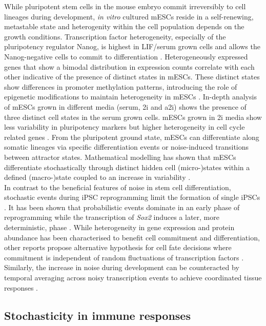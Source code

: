 While pluripotent stem cells in the mouse embryo commit irreversibly to cell lineages during development, \emph{in vitro} cultured \glspl{mESC} reside in a self-renewing, metastable state \citep{Hayashi2013} and heterogenity within the cell population depends on the growth conditions. Transcription factor heterogeneity, especially of the pluripotency regulator Nanog, is highest in \gls{LIF}/serum grown cells and allows the Nanog-negative cells to commit to differentiation \citep{Chickarmane2012, Torres-Padilla2014}. Heterogeneously expressed genes that show a bimodal distribution in expression counts correlate with each other indicative of the presence of distinct states in mESCs. These distinct states show differences in promoter methylation patterns, introducing the role of epigenetic modifications to maintain heterogeneity in mESCs \citep{Singer2014}. In-depth analysis of mESCs grown in different media (serum, \gls{2i} and \gls{a2i}) shows the presence of three distinct cell states in the serum grown cells. mESCs grown in 2i media show less variability in pluripotency markers but higher heterogeneity in cell cycle related genes \citep{Kolodziejczyk2015cell}. From the pluripotent ground state, mESCs can differentiate along somatic lineages via specific differentiation events or noise-induced transitions between attractor states. Mathematical modelling has shown that mESCs differentiate stochastically through distinct hidden cell (micro-)states within a defined (macro-)state coupled to an increase in variability \cite{Stumpf2017}.\\

In contrast to the beneficial features of noise in stem cell differentiation, stochastic events during \gls{iPSC} reprogramming limit the formation of single iPSCs \citep{Hanna2009, Yamanaka2009}. It has been shown that probabilistic events dominate in an early phase of reprogramming while the transcription of \textit{Sox2} induces a later, more deterministic, phase \cite{Buganim2012}. While heterogeneity in gene expression and protein abundance has been characterised to benefit cell commitment and differentiation, other reports propose alternative hypothesis for cell fate decisions where commitment is independent of random fluctuations of transcription factors \cite{Hoppe2016}. Similarly, the increase in noise during development can be counteracted by temporal averaging across noisy transcription events to achieve coordinated tissue responses \citep{Stapel2017}. 

\subsection{Stochasticity in immune responses}

